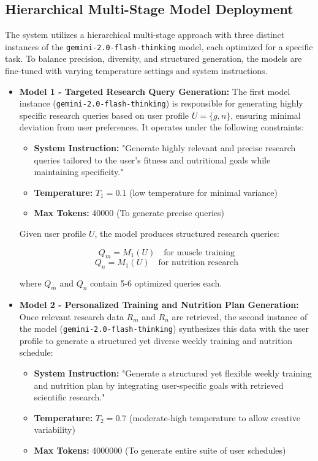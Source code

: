 \documentclass[conference]{IEEEtran}
\begin{document}
\subsection{Hierarchical Multi-Stage Model Deployment}
The system utilizes a hierarchical multi-stage approach with three distinct instances of the \texttt{gemini-2.0-flash-thinking} model, each optimized for a specific task. To balance precision, diversity, and structured generation, the models are fine-tuned with varying temperature settings and system instructions.

\begin{itemize}
    \item \textbf{Model 1 - Targeted Research Query Generation:}  
    The first model instance (\texttt{gemini-2.0-flash-thinking}) is responsible for generating highly specific research queries based on user profile $U = \{g, n\}$, ensuring minimal deviation from user preferences. It operates under the following constraints:

    \begin{itemize}
        \item \textbf{System Instruction:} "Generate highly relevant and precise research queries tailored to the user's fitness and nutritional goals while maintaining specificity."
        \item \textbf{Temperature:} $T_1 = 0.1$ (low temperature for minimal variance)
        \item \textbf{Max Tokens:} 40000 (To generate precise queries)
    \end{itemize}

    Given user profile $U$, the model produces structured research queries:
    
    \[
    Q_m = M_1(U) \quad \text{for muscle training}
    \]
    \[
    Q_n = M_1(U) \quad \text{for nutrition research}
    \]

    where $Q_m$ and $Q_n$ contain 5-6 optimized queries each.

    \item \textbf{Model 2 - Personalized Training and Nutrition Plan Generation:}  
    Once relevant research data $R_m$ and $R_n$ are retrieved, the second instance of the model (\texttt{gemini-2.0-flash-thinking}) synthesizes this data with the user profile to generate a structured yet diverse weekly training and nutrition schedule:

    \begin{itemize}
        \item \textbf{System Instruction:} "Generate a structured yet flexible weekly training and nutrition plan by integrating user-specific goals with retrieved scientific research."
        \item \textbf{Temperature:} $T_2 = 0.7$ (moderate-high temperature to allow creative variability)
        \item \textbf{Max Tokens:} 4000000 (To generate entire suite of user schedules)
    \end{itemize}


\end{itemize}
\end{document}
